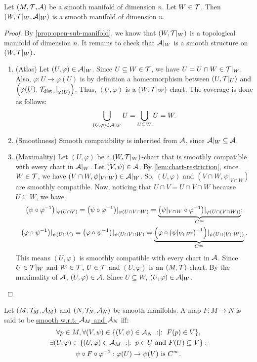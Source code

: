 \documentclass[11pt,reqno]{amsart}
\renewcommand{\phi}{\varphi}
\begin{document}
\begin{Thm}\label{thm:open-smooth-submanifold}
Let $(M,\mathcal{T},\mathcal{A})$ be a smooth manifold of dimension $n$.
Let $W\in\mathcal{T}$.
Then $(W,\mathcal{T}|_W,\mathcal{A}|_W)$ is a smooth manifold of dimension $n$.
\end{Thm}
\begin{proof}
By \ref{prop:open-sub-manifold}, we know that $(W,\mathcal{T}|_W)$ is a topological
manifold of dimension $n$.
It remains to check that $\mathcal{A}|_W$ is a smooth structure on $(W,\mathcal{T}|_W)$.
\begin{enumerate}
\item (Atlas)
Let $(U,\phi)\in\A|_W$.
Since $U\subseteq W\in\mathcal{T}$, we have $U=U\cap W\in\mathcal{T}|_W$.
Also, $\phi:U\to \phi(U)$ is by definition a homeomorphism between
$(U,\mathcal{T}|_U)$ and $\Br{\phi(U),\eval{\T_{\dist_n}}_{\phi(U)}}$.
Thus, $(U,\phi)$ is a $(W,\mathcal{T}|_W)$-chart.
The coverage is done as follows:
\[\bigcup_{(U,\phi)\in\A|_W}U=\bigcup_{U\subseteq W}U=W.\]


\item (Smoothness)
Smooth compatibility is inherited from $\mathcal{A}$, since $\mathcal{A}|_W\subseteq\mathcal{A}$.

\item (Maximality)
Let $(U,\phi)$ be a $(W,\mathcal{T}|_W)$-chart that is smoothly compatible with
every chart in $\mathcal{A}|_W$.
Let $(V,\psi)\in\mathcal{A}$.
By \ref{lem:chart-restriction}, since $W\in\mathcal{T}$,
we have $(V\cap W,\psi|_{V\cap W})\in\mathcal{A}|_W$.
So, $(U,\phi)$ and $(V\cap W,\psi|_{V\cap W})$ are smoothly compatible.
Now, noticing that $U\cap V=U\cap V\cap W$ because $U\subseteq W$, we have
\begin{gather*}
\Br{\psi\circ\phi\inv}|_{\phi(U\cap V)}
=\Br{\psi\circ\phi\inv}|_{\phi(U\cap V\cap W)}
=\underbrace{\Br{\psi|_{V\cap W}\circ\phi\inv}|_{\phi(U\cap(V\cap W))}}
_{C^\infty};\\
\Br{\phi\circ\psi\inv}|_{\psi(U\cap V)}
=\Br{\phi\circ\psi\inv}|_{\psi(U\cap V\cap W)}
=\underbrace{\Br{\phi\circ\Br{\psi|_{V\cap W}}\inv}|_{\psi(U\cap(V\cap W))}}
_{C^\infty}.\\
\end{gather*}
This means $(U,\phi)$ is smoothly compatible with every chart in $\mathcal{A}$.
Since $U\in\mathcal{T}|_W$ and $W\in\mathcal{T}$, $U\in\mathcal{T}$ and $(U,\phi)$ is an $(M,\mathcal{T})$-chart.
By the maximality of $\mathcal{A}$, $(U,\phi)\in\A$.
Since $U\subseteq W$, $(U,\phi)\in\A|_W$.
\end{enumerate}
\end{proof}

\begin{Def}
Let $(M,\mathcal{T}_M,\mathcal{A}_M)$ and $(N,\mathcal{T}_N,\mathcal{A}_N)$ be smooth manifolds.
A map $F:M\to N$ is said to be
\ul{smooth w.r.t. $\mathcal{A}_M$ and $\mathcal{A}_N$} iff:
\begin{gather*}
\forall p\in M,
\forall(V,\psi)\in\set{(V,\psi)\in\A_N\st F(p)\in V},\\
\exists(U,\phi)\in\set{(U,\phi)\in\A_M\st p\in U\tand F(U)\ss V}:\\
\psi\circ F\circ\phi\inv:\phi(U)\to\psi(V)~\text{is $C^\infty$}.
\end{gather*}
\end{Def}
\end{document}
